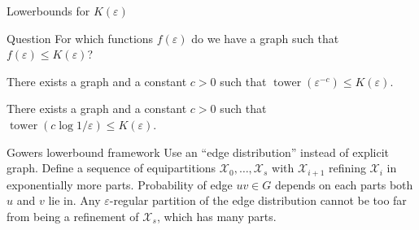 \documentclass{beamer}
\DeclareMathOperator{\twr}{\mathrm{tower}}
\newcommand{\1}{\mathbbm{1}}
\newcommand{\X}{\mathcal{X}}
\newcommand{\eps}{\varepsilon}
\begin{document}
\begin{frame}{Lowerbounds for $K(\eps)$}
  \begin{block}{Question}
    For which functions $f(\eps)$ do we have a graph such that $f(\eps) \le K(\eps)$?
  \end{block}

  \pause
  \begin{theorem}[Gowers (1997)]
    There exists a graph and a constant $c > 0$ such that $\twr(\eps^{-c}) \le K(\eps)$.
  \end{theorem}

  \pause

  \begin{corollary}[Gowers (1997)]
    There exists a graph and a constant $c > 0$ such that $\twr(c\log 1/\eps) \le
      K(\eps)$.
  \end{corollary}
\end{frame}




\begin{frame}{Gowers lowerbound framework}
  Use an ``edge distribution'' instead of explicit graph.
  \pause
  Define a sequence of equipartitions $\X_0, \dots, \X_s$ with $\X_{i + 1}$ refining
  $\X_i$ in exponentially more parts.
  \pause
  Probability of edge $uv \in G$ depends on each parts both $u$ and $v$ lie in.
  \pause
  Any $\eps$-regular partition of the edge distribution cannot be too far from being a
  refinement of $\X_s$, which has many parts.
\end{frame}
\end{document}

